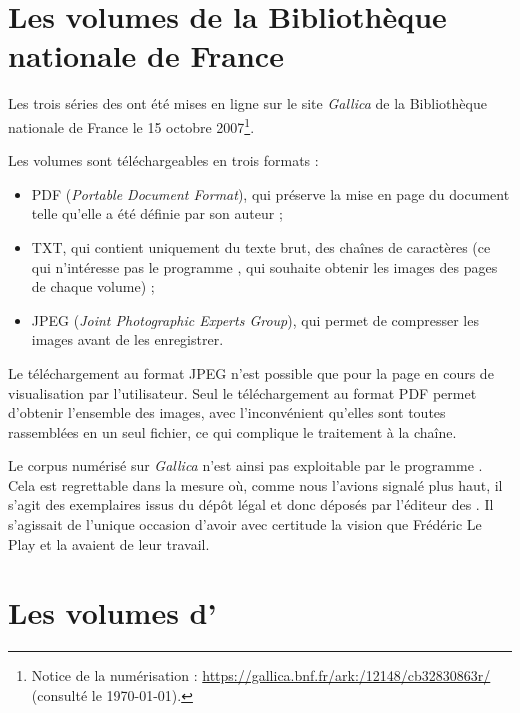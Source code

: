 \section{Les volumes de la Bibliothèque nationale de France}

Les trois séries des \odm{} ont été mises en ligne sur le site \textit{Gallica} de la Bibliothèque nationale de France le 15 octobre 2007\footnote{Notice de la numérisation : \url{https://gallica.bnf.fr/ark:/12148/cb32830863r/} (consulté le \today).}.

Les volumes sont téléchargeables en trois formats :

\begin{itemize}
    \item PDF (\textit{Portable Document Format}), qui préserve la mise en page du document telle qu'elle a été définie par son auteur ;
    \item TXT, qui contient uniquement du texte brut, \cad{} des chaînes de caractères (ce qui n'intéresse pas le programme \timeus, qui souhaite obtenir les images des pages de chaque volume) ;
    \item JPEG (\textit{Joint Photographic Experts Group}), qui permet de compresser les images avant de les enregistrer.
\end{itemize}

Le téléchargement au format JPEG n'est possible que pour la page en cours de visualisation par l'utilisateur. Seul le téléchargement au format PDF permet d'obtenir l'ensemble des images, avec l'inconvénient qu'elles sont toutes rassemblées en un seul fichier, ce qui complique le traitement à la chaîne.

Le corpus numérisé sur \textit{Gallica} n'est ainsi pas exploitable par le programme \timeus. Cela est regrettable dans la mesure où, comme nous l'avions signalé plus haut, il s'agit des exemplaires issus du dépôt légal et donc déposés par l'éditeur des \odm. Il s'agissait de l'unique occasion d'avoir avec certitude la vision que Frédéric Le Play et la \sess{} avaient de leur travail.

\section{Les volumes d'\ia}

